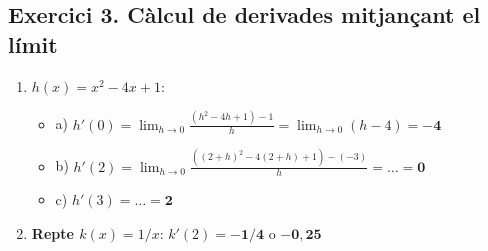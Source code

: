 \documentclass[12pt,a4paper]{article}
\begin{document}
\subsection*{Exercici 3. Càlcul de derivades mitjançant el límit}
\begin{enumerate}[label=\textbf{\arabic*.}]
    \setcounter{enumerate}{1}
    \item \textbf{$h(x) = x^2 - 4x + 1$}:
    \begin{itemize}
        \item a) $h'(0) = \lim_{h \to 0} \frac{(h^2-4h+1)-1}{h} = \lim_{h \to 0} (h-4) = \mathbf{-4}$
        \item b) $h'(2) = \lim_{h \to 0} \frac{((2+h)^2-4(2+h)+1)-(-3)}{h} = \dots = \mathbf{0}$
        \item c) $h'(3) = \dots = \mathbf{2}$ 
    \end{itemize}
    \item \textbf{Repte $k(x) = 1/x$}: $k'(2) = \mathbf{-1/4}$ o $\mathbf{-0,25}$ 
\end{enumerate}
\end{document}
